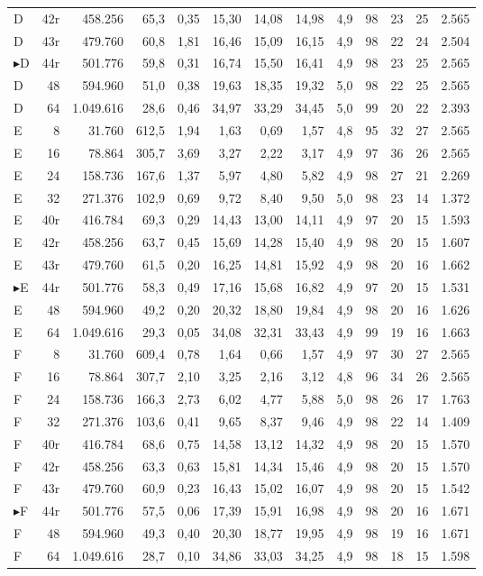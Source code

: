 {\begin{longtable}{l r r r r r r r r r r r r}
D & 42r & 458.256 & 65,3 & 0,35 & 15,30 & 14,08 & 14,98 & 4,9 & 98 & 23 & 25 & 2.565 \\
D & 43r & 479.760 & 60,8 & 1,81 & 16,46 & 15,09 & 16,15 & 4,9 & 98 & 22 & 24 & 2.504 \\
$\blacktriangleright$D & 44r & 501.776 & 59,8 & 0,31 & 16,74 & 15,50 & 16,41 & 4,9 & 98 & 23 & 25 & 2.565 \\
D & 48 & 594.960 & 51,0 & 0,38 & 19,63 & 18,35 & 19,32 & 5,0 & 98 & 22 & 25 & 2.565 \\
D & 64 & 1.049.616 & 28,6 & 0,46 & 34,97 & 33,29 & 34,45 & 5,0 & 99 & 20 & 22 & 2.393 \\
\midrule
E & 8 & 31.760 & 612,5 & 1,94 & 1,63 & 0,69 & 1,57 & 4,8 & 95 & 32 & 27 & 2.565 \\
E & 16 & 78.864 & 305,7 & 3,69 & 3,27 & 2,22 & 3,17 & 4,9 & 97 & 36 & 26 & 2.565 \\
E & 24 & 158.736 & 167,6 & 1,37 & 5,97 & 4,80 & 5,82 & 4,9 & 98 & 27 & 21 & 2.269 \\
E & 32 & 271.376 & 102,9 & 0,69 & 9,72 & 8,40 & 9,50 & 5,0 & 98 & 23 & 14 & 1.372 \\
E & 40r & 416.784 & 69,3 & 0,29 & 14,43 & 13,00 & 14,11 & 4,9 & 97 & 20 & 15 & 1.593 \\
E & 42r & 458.256 & 63,7 & 0,45 & 15,69 & 14,28 & 15,40 & 4,9 & 98 & 20 & 15 & 1.607 \\
E & 43r & 479.760 & 61,5 & 0,20 & 16,25 & 14,81 & 15,92 & 4,9 & 98 & 20 & 16 & 1.662 \\
$\blacktriangleright$E & 44r & 501.776 & 58,3 & 0,49 & 17,16 & 15,68 & 16,82 & 4,9 & 97 & 20 & 15 & 1.531 \\
E & 48 & 594.960 & 49,2 & 0,20 & 20,32 & 18,80 & 19,84 & 4,9 & 98 & 20 & 16 & 1.626 \\
E & 64 & 1.049.616 & 29,3 & 0,05 & 34,08 & 32,31 & 33,43 & 4,9 & 99 & 19 & 16 & 1.663 \\
\midrule
F & 8 & 31.760 & 609,4 & 0,78 & 1,64 & 0,66 & 1,57 & 4,9 & 97 & 30 & 27 & 2.565 \\
F & 16 & 78.864 & 307,7 & 2,10 & 3,25 & 2,16 & 3,12 & 4,8 & 96 & 34 & 26 & 2.565 \\
F & 24 & 158.736 & 166,3 & 2,73 & 6,02 & 4,77 & 5,88 & 5,0 & 98 & 26 & 17 & 1.763 \\
F & 32 & 271.376 & 103,6 & 0,41 & 9,65 & 8,37 & 9,46 & 4,9 & 98 & 22 & 14 & 1.409 \\
F & 40r & 416.784 & 68,6 & 0,75 & 14,58 & 13,12 & 14,32 & 4,9 & 98 & 20 & 15 & 1.570 \\
F & 42r & 458.256 & 63,3 & 0,63 & 15,81 & 14,34 & 15,46 & 4,9 & 98 & 20 & 15 & 1.570 \\
F & 43r & 479.760 & 60,9 & 0,23 & 16,43 & 15,02 & 16,07 & 4,9 & 98 & 20 & 15 & 1.542 \\
$\blacktriangleright$F & 44r & 501.776 & 57,5 & 0,06 & 17,39 & 15,91 & 16,98 & 4,9 & 98 & 20 & 16 & 1.671 \\
F & 48 & 594.960 & 49,3 & 0,40 & 20,30 & 18,77 & 19,95 & 4,9 & 98 & 19 & 16 & 1.671 \\
F & 64 & 1.049.616 & 28,7 & 0,10 & 34,86 & 33,03 & 34,25 & 4,9 & 98 & 18 & 15 & 1.598 \\
\bottomrule
\end{longtable}
}
